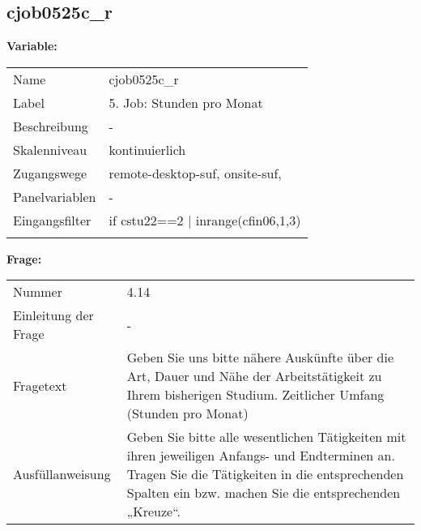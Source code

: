 	
	
	\subsection{cjob0525c\_r}
	\label{subSection:cjob0525c_r}

	\noindent\textbf{Variable:}\\
		\begin{tabular}{lL{11.3cm}}
			\label{tableVariable:cjob0525c_r}
			Name & cjob0525c\_r \\
			Label & 5. Job: Stunden pro Monat \\
			Beschreibung & - \\
			Skalenniveau & kontinuierlich \\
			Zugangswege &
				remote-desktop-suf,
				onsite-suf,
 \\
			Panelvariablen & -
			 \\
			Eingangsfilter & if cstu22==2 | inrange(cfin06,1,3) \\
 \\
		\end{tabular}

		\vspace*{1 cm}
		\noindent\textbf{Frage:}\\
		\begin{tabular}{lL{11.3cm}}
			\label{tableQuestion:cjob0525c_r}
			Nummer & 4.14 \\
			Einleitung der Frage & - \\
			Fragetext & Geben Sie uns bitte nähere Auskünfte über die Art, Dauer und Nähe der Arbeitstätigkeit zu Ihrem bisherigen Studium.
Zeitlicher Umfang
(Stunden pro Monat) \\
			Ausfüllanweisung & Geben Sie bitte alle wesentlichen Tätigkeiten mit ihren jeweiligen Anfangs- und Endterminen an. Tragen Sie die Tätigkeiten in die entsprechenden Spalten ein bzw. machen Sie die entsprechenden „Kreuze“. \\
		\end{tabular}




